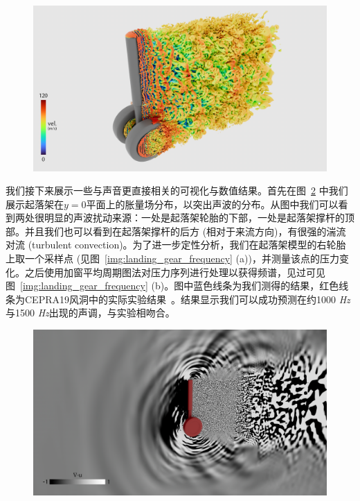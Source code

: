 \begin{figure}[!htbp]
  \centering
    \includegraphics[width=0.99\columnwidth]{figures/landing_gear_q_criterion.png}
  \label{img:landing_gear_q_criterion}
\end{figure}

我们接下来展示一些与声音更直接相关的可视化与数值结果。首先在图~\ref{img:landing_gear_divergence} 中我们展示起落架在$y=0$平面上的胀量场分布，以突出声波的分布。从图中我们可以看到两处很明显的声波扰动来源：一处是起落架轮胎的下部，一处是起落架撑杆的顶部。并且我们也可以看到在起落架撑杆的后方 (相对于来流方向)，有很强的湍流对流 (turbulent convection)。为了进一步定性分析，我们在起落架模型的右轮胎上取一个采样点 (见图~\ref{img:landing_gear_frequency} (a))，并测量该点的压力变化。之后使用加窗平均周期图法对压力序列进行处理以获得频谱，见过可见图~\ref{img:landing_gear_frequency} (b)。图中蓝色线条为我们测得的结果，红色线条为CEPRA19风洞中的实际实验结果~\citep{doi:10.2514/6.2015-2993}。结果显示我们可以成功预测在约1000 \textit{Hz}与1500 \textit{Hz}出现的声调，与实验相吻合。

\begin{figure}[!htbp]
  \centering
    \includegraphics[width=0.99\columnwidth]{figures/landing_gear_divergence.png}
  \label{img:landing_gear_divergence}
\end{figure}

